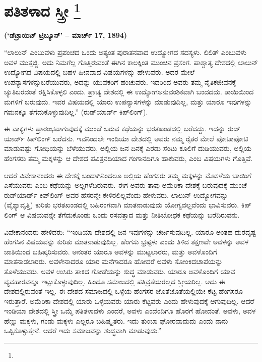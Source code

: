 
\chapter[ಪತಿತಳಾದ ಸ್ತ್ರೀ ]{ಪತಿತಳಾದ ಸ್ತ್ರೀ \protect\footnote{}}

\centerline{\textbf{(‘ಡೆಟ್ರಾಯಿಟ್​ ಟ್ರಿಬ್ಯೂನ್​’ – ಮಾರ್ಚ್​ 17, 1894)}}

\vskip 3pt

“ಲಾಲುನ್​ ಎಂಬುವಳು ಪ್ರಪಂಚದ ಒಂದು ಅತ್ಯಂತ ಪುರಾತನವಾದ ಉದ್ಯೋಗದ ಸದಸ್ಯಳು. ಲಿಲಿತ್​ ಎಂಬುವಳು ಅವಳ ಮುತ್ತಜ್ಜಿ. ಅದು ನಿಮಗೆಲ್ಲ ಗೊತ್ತಿರುವಂತೆ ಈಗಿನ ಕಾಲಕ್ಕಿಂತ ಮುಂಚಿನ ಪ್ರಸಂಗ. ಪಾಶ್ಚಾತ್ಯ ದೇಶದಲ್ಲಿ ಲಾಲುನ್​ ಉದ್ಯೋಗದ ವಿಷಯದಲ್ಲಿ ಬಹಳ ಹೀನವಾದ ವಿಷಯಗಳನ್ನು ಹೇಳುವರು. ಅದರ ಮೇಲೆ ಉಪನ್ಯಾಸಗಳನ್ನು\break ಬರೆಯುವರು, ಅದನ್ನು ಯುವಕರಿಗೆ ಹಂಚುವರು. ಇದರಿಂದ ಅವರು ತಮ್ಮ ನೈತಿಕ\break ಜೀವನಕ್ಕೆ ಚ್ಯುತಿಬರದಂತೆ ರಕ್ಷಿಸಿಕೊಳ್ಳಲಿ ಎಂದು. ಪ್ರಾಚ್ಯ ದೇಶದಲ್ಲಿ ಈ ಉದ್ಯೋಗ\break ಅನುವಂಶಿಕವಾಗಿ ಬಂದದದು. ತಾಯಿಯಿಂದ ಮಗಳಿಗೆ ಬರುವುದು. ಇವರ ವಿಷಯದಲ್ಲಿ ಯಾರು ಉಪನ್ಯಾಸಗಳನ್ನು ಮಾಡುವುದಿಲ್ಲ, ಮತ್ತು ಯಾರೂ ಇವುಗಳನ್ನು ಗಮನಕ್ಕೂ ತೆಗೆದುಕೊಳ್ಳುವುದಿಲ್ಲ.” (ರುಡ್​ಯಾರ್ಡ್​ ಕಿಪ್​ಲಿಂಗ್​).

\vskip 3pt

ಈ ವಾಕ್ಯಗಳು ಪ್ರಾರಂಭವಾಗುವುದಕ್ಕೆ ಮುಂಚೆ ಬರುವ ಕಥೆಯನ್ನು ಭರತಖಂಡದಲ್ಲಿ ಬರೆದದ್ದು. ಇದನ್ನು ರುಡ್​ಯಾರ್ಡ್​ ಕಿಪ್​ಲಿಂಗ್​ ಬರೆದನು. ಇವನಿಂದಲೇ ಇಂಡಿಯಾ ದೇಶದಲ್ಲಿ ಅವರು ನಮ್ಮ ರೈತರ ಮೇಲೆ ಪೋಟಾಪೋಟಿ ಮಾಡುವಷ್ಟು ಗೋಧಿಯನ್ನು ಬೆಳೆಯುವರು, ಅಲ್ಲಿಯ ಜನ ದಿನಕ್ಕೆ ಎರಡು ಸೆಂಟು ಕೂಲಿಗೆ ದುಡಿಯುವರು, ಅಲ್ಲಿಯ ಹೆಂಗಸರು ತಮ್ಮ ಮಕ್ಕಳನ್ನು ಆ ದೇಶದ ಪವಿತ್ರನದಿಯಾದ ಗಂಗಾನದಿಗೂ ಹಾಕುವರು, ಎಂಬ ವಿಷಯಗಳು ಗೊತ್ತಿವೆ.

\vskip 3pt

ಆದರೆ ವಿವೇಕಾನಂದರು ಈ ದೇಶಕ್ಕೆ ಬಂದಾಗಿನಿಂದಲೂ ಅಲ್ಲಿಯ ಹೆಂಗಸರು ತಮ್ಮ ಮಕ್ಕಳನ್ನು ಮೊಸಳೆಯ ಬಾಯಿಗೆ ಎಸೆಯುವರು ಎಂಬ ಕಥೆಯನ್ನು ಅಲ್ಲಗಳೆದಿರುವರು. ಈಗ ಅವರು ತಾವು ಅಮೆರಿಕಾ ದೇಶಕ್ಕೆ ಬರುವುದಕ್ಕೆ ಮುಂಚೆ ರುಡ್​ಯಾರ್ಡ್​ ಕಿಪ್​ಲಿಂಗ್​ ಅವರ ಹೆಸರನ್ನೇ ಕೇಳಿರಲಿಲ್ಲವೆಂದು ಹೇಳುವರು. ಲಾಲುನ್​ ಉದ್ಯೋಗವನ್ನು (ವೈಶ್ಯಾವೃತ್ತಿ) ಕುರಿತು ಭರತಖಂಡದಲ್ಲಿ ಬಹಿರಂಗವಾಗಿ ಮಾತನಾಡುವುದು ಯೋಗ್ಯವಲ್ಲವೆಂದು ಭಾವಿಸುವರು. ಕಿಪ್​ಲಿಂಗ್​ ಆ ವಿಷಯವನ್ನೇ ತೆಗೆದುಕೊಂಡು ಒಂದು ರಸವತ್ತಾದ ಮತ್ತು ನೀತಿಬೋಧಕ ಕಥೆಯನ್ನು ಬರೆದಿರುವನು.

\vskip 3pt

ವಿವೇಕಾನಂದರು ಹೇಳಿದರು: “ಇಂಡಿಯಾ ದೇಶದಲ್ಲಿ ಜನ ಇವುಗಳನ್ನು ಚರ್ಚಿಸುವುದಿಲ್ಲ. ಯಾರೂ ಅಂತಹ ದುರದೃಷ್ಟ ಹೆಂಗಸಿನ ವಿಷಯವನ್ನು ಕುರಿತು ಮಾತನಾಡುವುದಿಲ್ಲ. ಹೆಂಗಸು ಭ್ರಷ್ಟಳು ಎಂದು ತಿಳಿದ ತಕ್ಷಣವೇ ಅವಳನ್ನು ಅವಳ ಜಾತಿಯಿಂದ ಬಹಿಷ್ಕರಿಸುವರು. ಅನಂತರ ಯಾರೂ ಅವಳನ್ನು ಮುಟ್ಟಲಾರರು, ಮತ್ತು ಅವಳೊಂದಿಗೆ ಮಾತನಾಡಲಾರರು. ಅವಳೇನಾದರೂ ಯಾರ ಮನೆಗಾದರೂ ಹೋದರೆ ಅವಳು ಸೋಂಕಿದ\break ಚಾಪೆಯನ್ನು ತೊಳೆಯುವರು. ಅವಳ ಉಸಿರು ತಾಕಿದ ಗೋಡೆಯನ್ನು ಶುದ್ಧ ಮಾಡುವರು. ಯಾರೂ ಅವಳೊಂದಿಗೆ ಯಾವ ವ್ಯವಹಾರವನ್ನೂ ಇಟ್ಟುಕೊಳ್ಳುವುದಿಲ್ಲ. ಹಿಂದೂ ಸಮಾಜದಲ್ಲಿ ಪತಿವ್ರತೆಯರಲ್ಲದ ಸ್ತ್ರೀಯರಿಲ್ಲ. ಅದು ಈ ದೇಶದಲ್ಲಿರುವಂತೆ ಇಲ್ಲ. ಈ ದೇಶದ ಸಮಾಜದಲ್ಲಿ ಒಳ್ಳೆಯ ಹೆಂಗಸರ ಜೊತೆಜೊತೆಯಲ್ಲಿಯೇ ಕೆಟ್ಟ ಹೆಂಗಸರೂ ಇರುತ್ತಾರೆ. ಅಮೆರಿಕಾ ದೇಶದಲ್ಲಿ ಯಾರು ಒಳ್ಳೆಯವರು ಯಾರು ಕೆಟ್ಟವರು ಎಂದು ಹೇಳುವುದಕ್ಕೆ ಆಗುವುದಿಲ್ಲ. ಆದರೆ ಇಂಡಿಯಾ ದೇಶದಲ್ಲಿ ಸ್ತ್ರೀ ಒಮ್ಮೆ ಪತಿತಳಾದಳು ಎಂದರೆ, ಅವಳು ಎಂದೆಂದಿಗೂ ಹೊರಗೆ ಹೋದಂತೆ. ಅವಳು, ಅವಳ ಹೆಣ್ಣು ಮಕ್ಕಳು, ಗಂಡು ಮಕ್ಕಳು ಎಲ್ಲರೂ ಬಹಿಷ್ಕೃತರು. ಇದು ತುಂಬಾ ಘೋರವಾದುದು ಎಂದು ನಾನು ಒಪ್ಪಿಕೊಳ್ಳುತ್ತೇನೆ. ಆದರೆ ಇದು ಸಮಾಜವನ್ನು ಶುದ್ಧವಾಗಿ ಮಾಡುವುದು.”

